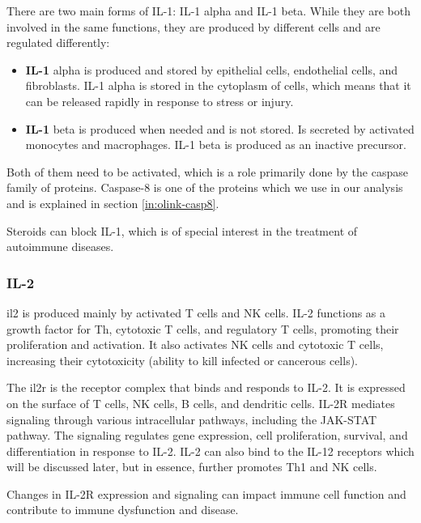 There are two main forms of IL-1: IL-1 alpha and IL-1 beta. While they are both involved in the same functions, they are produced by different cells and are regulated differently:

\begin{itemize}

    \item {\textbf{IL-1}} alpha is produced and stored by epithelial cells, endothelial cells, and fibroblasts. IL-1 alpha is stored in the cytoplasm of cells, which means that it can be released rapidly in response to stress or injury.
    
    \item {\textbf{IL-1}} beta is produced when needed and is not stored. Is secreted by activated monocytes and macrophages. IL-1 beta is produced as an inactive precursor.

\end{itemize}

Both of them need to be activated, which is a role primarily done by the caspase family of proteins. Caspase-8 is one of the proteins which we use in our analysis and is explained in section \ref{in:olink-casp8}.

Steroids can block IL-1, which is of special interest in the treatment of autoimmune diseases.

\subsubsection{IL-2}
\label{in:IL2}

\gls{il2} is produced mainly by activated T cells and NK cells. IL-2 functions as a growth factor for Th, cytotoxic T cells, and regulatory T cells, promoting their proliferation and activation. It also activates NK cells and cytotoxic T cells, increasing their cytotoxicity (ability to kill infected or cancerous cells).

The \gls{il2r} is the receptor complex that binds and responds to IL-2. It is expressed on the surface of T cells, NK cells, B cells, and dendritic cells. IL-2R mediates signaling through various intracellular pathways, including the JAK-STAT pathway. The signaling regulates gene expression, cell proliferation, survival, and differentiation in response to IL-2. IL-2 can also bind to the IL-12 receptors which will be discussed later, but in essence, further promotes Th1 and NK cells.

Changes in IL-2R expression and signaling can impact immune cell function and contribute to immune dysfunction and disease.

